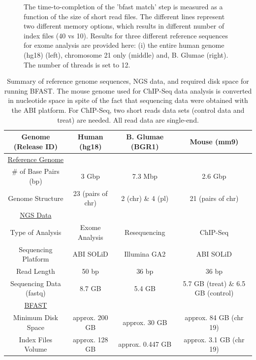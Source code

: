 \documentclass{cpeauth}
\begin{document}
\begin{figure}
\caption{\small The time-to-completion of the 'bfast match' step is
  measured as a function of the size of short read files.  The
  different lines represent two different memory options, which
  results in different number of index files (40 vs 10). Results for
  three different reference sequences for exome analysis are provided
  here: (i) the entire human genome (hg18) (left), chromosome 21 only
  (middle) and, B. Glumae (right).  The number of threads is set to
  12.}
  \label{fig:parallel-execution} 
 \end{figure}




\begin{table}
\small
\begin{tabular}{|c|c|c|c|} 
  \hline 
Genome (Release ID)   & Human (hg18) & B. Glumae (BGR1) & Mouse (mm9)  \\    
   
\hline \hline
\underline{Reference Genome} & & & \\
    \# of Base Pairs (bp) &  3 Gbp & 7.3 Mbp & 2.6 Gbp\\ 
   Genome Structure &   23 (pairs of chr)  & 2 (chr) \& 4 (pl) & 21 (pairs of chr)   \\   
 
      \hline \hline
  \underline{NGS Data} & &   & \\
      Type of  Analysis &  Exome Analysis &  Resequencing & ChIP-Seq\\ 
  
          Sequencing Platform & ABI SOLiD  &  Illumina GA2 & ABI SOLiD \\ 
          Read Length & 50 bp & 36 bp & 36 bp \\

  Sequencing Data (fastq)  & 8.7 GB & 5.4 GB & 5.7 GB (treat) \& 6.5 GB (control) \\
  
  
  \hline  \hline
  \underline{BFAST} & &  & \\
  Minimum Disk Space &  approx. 200 GB   &    approx. 30 GB  &  approx. 84 GB (chr 19)\\
   Index Files Volume  & approx. 128 GB  & approx. 0.447 GB  & approx. 3.1 GB (chr 19)\\ 
\hline  \hline
\end{tabular} \caption{Summary of reference genome sequences, NGS data, and required disk
  space for running BFAST.  The mouse genome used for ChIP-Seq data analysis
  is converted in nucleotide space in spite of the fact that sequencing
  data were obtained with the ABI platform.  
  For ChIP-Seq, two short reads
  data sets (control data and treat) are needed.  All read data are single-end.}
 \label{table:two-genomes} 
\end{table}
\end{document}
